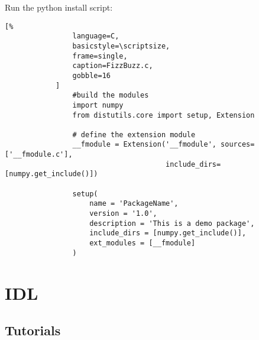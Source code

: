 \documentclass[crop=false,class=book,oneside]{standalone}
\begin{document}
            Run the python install script:
            \begin{lstlisting}[%
                language=C,
                basicstyle=\scriptsize,
                frame=single,
                caption=FizzBuzz.c,
                gobble=16
            ]
                #build the modules
                import numpy
                from distutils.core import setup, Extension
                
                # define the extension module
                __fmodule = Extension('__fmodule', sources=['__fmodule.c'],
                                      include_dirs=[numpy.get_include()])
                
                setup(
                    name = 'PackageName',
                    version = '1.0',
                    description = 'This is a demo package',
                    include_dirs = [numpy.get_include()],
                    ext_modules = [__fmodule]
                )
        \end{lstlisting}
    \section{IDL}
        \subsection{Tutorials}
\end{document}
